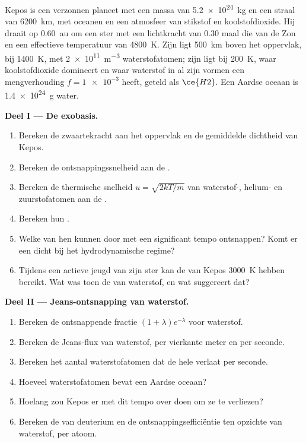 \begin{problem}
\label{pb:b3:planetary-atmospheres:1}
Kepos is een verzonnen planeet met een massa van \qty{5.2e24}{kg} en een
straal van \qty{6200}{km}, met oceanen en een atmosfeer van stikstof en
koolstofdioxide. Hij draait op \qty{0.60}{au} om een ster met een lichtkracht van 0.30 maal die van de
Zon en een effectieve temperatuur van \qty{4800}{K}. Zijn  ligt
\qty{500}{km} boven het oppervlak, bij \qty{1400}{K}, met
\qty{2e11}{m^{-3}} waterstofatomen; zijn  ligt bij \qty{200}{K},
waar koolstofdioxide domineert en waar waterstof in al zijn vormen een
mengverhouding $f = \num{1e-3}$ heeft, geteld als $\ce{H2}$. Een Aardse oceaan is
\qty{1.4e24}{g} water.

\medskip\noindent\textbf{Deel I --- De exobasis.}
\begin{enumerate}
\item Bereken de zwaartekracht aan het oppervlak en de gemiddelde dichtheid van Kepos.
\item Bereken de ontsnappingssnelheid aan de .
\item Bereken de thermische snelheid $u = \sqrt{2kT/m}$ van waterstof-, helium- en
  zuurstofatomen aan de .
\item Bereken hun .
\item Welke van hen kunnen door  met een significant tempo ontsnappen?
  Komt er een dicht bij het hydrodynamische regime?
\item Tijdens een actieve jeugd van zijn ster kan de  van Kepos
  \qty{3000}{K} hebben bereikt. Wat was toen de  van waterstof,
  en wat suggereert dat?
\end{enumerate}

\medskip\noindent\textbf{Deel II --- Jeans-ontsnapping van waterstof.}
\begin{enumerate}[resume]
\item Bereken de ontsnappende fractie $(1 + \lambda)e^{-\lambda}$ voor
  waterstof.
\item Bereken de Jeans-flux van waterstof, per vierkante meter en per seconde.
\item Bereken het aantal waterstofatomen dat de hele  verlaat
  per seconde.
\item Hoeveel waterstofatomen bevat een Aardse oceaan?
\item Hoelang zou Kepos er met dit tempo over doen om ze te verliezen?
\item Bereken de  van deuterium en de ontsnappingsefficiëntie
  ten opzichte van waterstof, per atoom.
\end{enumerate}


\end{problem}
